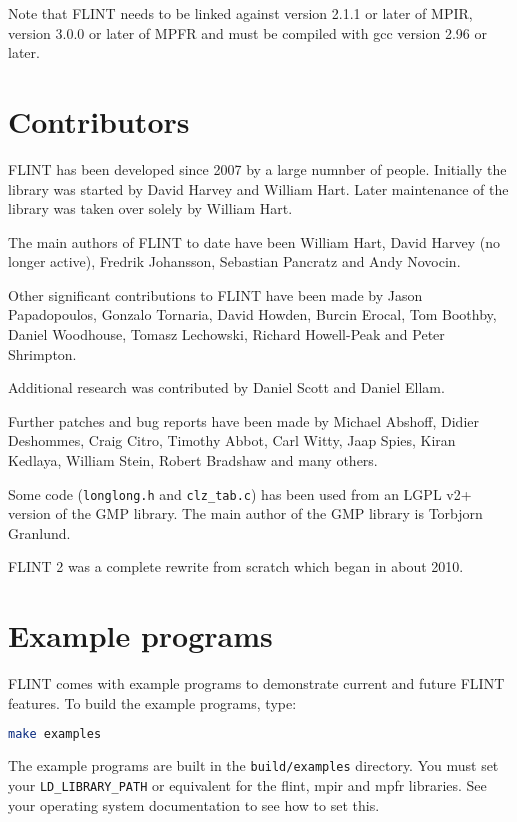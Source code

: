 \documentclass[a4paper,10pt]{book}
\newcommand{\code}{\lstinline}
\begin{document}
Note that FLINT needs to be linked against version 2.1.1 or later of MPIR,
version 3.0.0 or later of MPFR and must be compiled with gcc version 2.96 
or later.  

\chapter{Contributors}

FLINT has been developed since 2007 by a large numnber of people. Initially
the library was started by David Harvey and William Hart. Later maintenance
of the library was taken over solely by William Hart.

The main authors of FLINT to date have been William Hart, David Harvey (no
longer active), Fredrik Johansson, Sebastian Pancratz and Andy Novocin.

Other significant contributions to FLINT have been made by Jason Papadopoulos,
Gonzalo Tornaria, David Howden, Burcin Erocal, Tom Boothby, Daniel Woodhouse, 
Tomasz Lechowski, Richard Howell-Peak and Peter Shrimpton.

Additional research was contributed by Daniel Scott and Daniel Ellam.

Further patches and bug reports have been made by Michael Abshoff, Didier 
Deshommes, Craig Citro, Timothy Abbot, Carl Witty, Jaap Spies, Kiran 
Kedlaya, William Stein, Robert Bradshaw and many others.

Some code (\code{longlong.h} and \code{clz_tab.c}) has been used from
an LGPL v2+ version of the GMP library. The main author of the GMP 
library is Torbjorn Granlund.

FLINT 2 was a complete rewrite from scratch which began in about 2010.
 
\chapter{Example programs}

FLINT comes with example programs to demonstrate current and future FLINT 
features.  To build the example programs, type:

\begin{lstlisting}[language=bash]
make examples
\end{lstlisting}

The example programs are built in the \code{build/examples} directory.
You must set your \code{LD_LIBRARY_PATH} or equivalent for the flint, mpir
and mpfr libraries. See your operating system documentation to see how to
set this.
\end{document}
